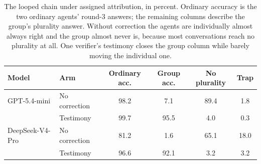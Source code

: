 \begin{table}[!ht]
\centering
\caption{The looped chain under assigned attribution, in percent. Ordinary
accuracy is the two ordinary agents' round-3 answers; the remaining columns
describe the group's plurality answer. Without correction the agents are
individually almost always right and the group almost never is, because most
conversations reach no plurality at all. One verifier's testimony closes the
group column while barely moving the individual one.}
\label{tab:chain}
\small
\begin{tabular}{llcccc}
\toprule
Model & Arm & Ordinary acc. & Group acc. & No plurality & Trap \\
\midrule
GPT-5.4-mini & No correction & 98.2 & 7.1 & 89.4 & 1.8 \\
 & Testimony & 99.7 & 95.5 & 4.0 & 0.3 \\
\addlinespace
DeepSeek-V4-Pro & No correction & 81.2 & 1.6 & 65.1 & 18.0 \\
 & Testimony & 96.6 & 92.1 & 3.2 & 3.2 \\
\bottomrule
\end{tabular}
\end{table}
